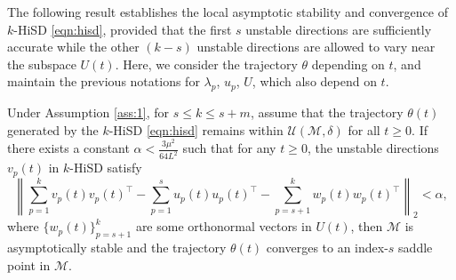\documentclass[final]{siamart251216}
\begin{document}
The following result establishes the local asymptotic stability and convergence of $k$-HiSD \eqref{eqn:hisd}, provided that the first $s$ unstable directions are sufficiently accurate while the other $(k-s)$ unstable directions are allowed to vary near the subspace $U(t)$.
Here, we consider the trajectory $\theta$ depending on $t$, and maintain the previous notations for $\lambda_p$, $u_p$, $U$, which also depend on $t$.
\begin{theorem}\label{thm:inaccurate}
Under Assumption \ref{ass:1}, for $s\leqslant k\leqslant s+m$, assume that the trajectory $\theta(t)$ generated by the $k$-HiSD \eqref{eqn:hisd} remains within $\mathcal{U}(\mathcal{M},\delta)$ for all $t\geqslant 0$. 
If there exists a constant $\alpha< \frac{3\mu^2}{64L^2}$ such that for any $t \geqslant 0$, the unstable directions $v_p(t)$ in $k$-HiSD satisfy
\begin{equation}
\left\| \sum_{p=1}^k v_p(t)v_p(t)^\top  
- \sum_{p=1}^s u_p(t)u_p(t)^\top
- \sum_{p=s+1}^k w_p(t)w_p(t)^\top
\right\|_2 < \alpha, 
\end{equation}
where $\{w_p{(t)}\}_{p=s+1}^{k}$ are some orthonormal vectors in $U(t)$, 
then $\mathcal{M}$ is asymptotically stable and the trajectory $\theta(t)$ converges to an index-$s$ saddle point in $\mathcal{M}$.
\end{theorem}
\end{document}
